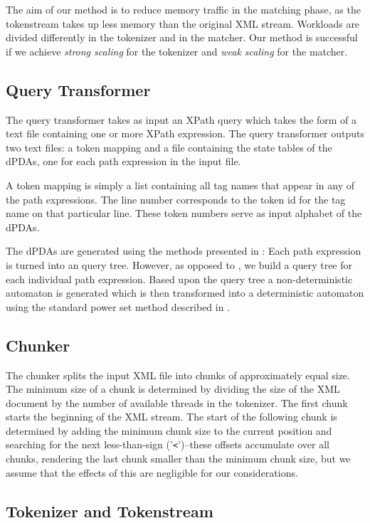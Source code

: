 The aim of our method is to reduce memory traffic in the matching phase, as the
tokenstream takes up less memory than the original XML stream. Workloads are
divided differently in the tokenizer and in the matcher. Our method is
successful if we achieve \emph{strong scaling} for the tokenizer and \emph{weak
scaling} for the matcher.

\subsection{Query Transformer}

The query transformer takes as input an XPath query which takes the form of a
text file containing one or more XPath expression. The query transformer outputs
two text files: a token mapping and a file containing the state tables of
the dPDAs, one for each path expression in the input file.

A token mapping is simply a list containing all tag names that appear in any of
the path expressions. The line number corresponds to the token id for the tag
name on that particular line. These token numbers serve as input alphabet of
the dPDAs.

The dPDAs are generated using the methods presented in \cite{Green2004}: Each
path expression is turned into an query tree. However, as opposed to
\cite{Green2004}, we build a query tree for each individual path expression.
Based upon the query tree a non-deterministic automaton is generated which is
then transformed into a deterministic automaton using the standard power set
method described in \cite{Hopcroft2006}.

\subsection{Chunker}

The chunker splits the input XML file into chunks of approximately equal size.
The minimum size of a chunk is determined by dividing the size of the XML
document by the number of available threads in the tokenizer. The first chunk
starts the beginning of the XML stream. The start of the following chunk is
determined by adding the minimum chunk size to the current position and
searching for the next less-than-sign ('\texttt{<}')–these offsets accumulate
over all chunks, rendering the last chunk smaller than the minimum chunk size,
but we assume that the effects of this are negligible for our considerations.

\subsection{Tokenizer and Tokenstream}

